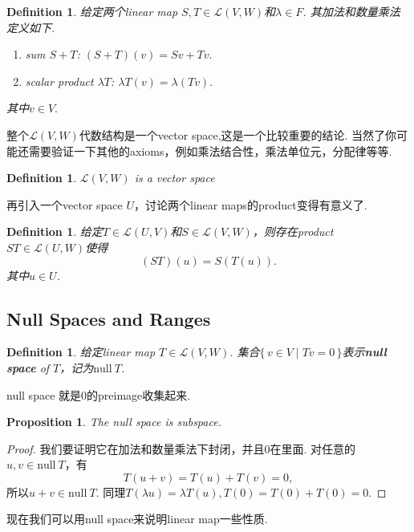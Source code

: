 \documentclass{article}
\newtheorem{proposition}[theorem]{Proposition}
\newtheorem{definition}[theorem]{Definition}
\newcommand\Set[2]{\{\,#1\mid#2\,\}} %
\newcommand\nul[1]{\text{null}\ #1}
\begin{document}
\begin{definition}
\rm 给定两个linear map $S,T \in \mathcal{L}(V,W)$和$\lambda \in F$. 其加法和数量乘法定义如下. 
\begin{enumerate}
	\item sum $S+T$: $(S+T)(v) = Sv+Tv.$
	\item scalar product $\lambda T$: $\lambda T(v) = \lambda(Tv).$
\end{enumerate}
其中$v \in V.$
\end{definition}

{\color{red} 整个$\mathcal{L}(V,W)$代数结构是一个vector space,这是一个比较重要的结论}. 当然了你可能还需要验证一下其他的axioms，例如乘法结合性，乘法单位元，分配律等等.

\begin{definition}
\rm $\mathcal{L}(V,W)$ is a vector space
\end{definition}

{\color{red} 再引入一个vector space $U$，讨论两个linear maps的product变得有意义了}.

\begin{definition}
\rm 给定$T \in \mathcal{L}(U,V)$和$S \in \mathcal{L}(V,W)$，则存在product $ST \in \mathcal{L}(U,W)$使得
$$
	(ST)(u) = S(T(u)).
$$
其中$u \in U$. 
\end{definition}

\newpage
\subsection{Null Spaces and Ranges}

\begin{definition}
\rm 给定linear map $T \in \mathcal{L}(V,W)$. 集合$\Set{v \in V}{Tv = 0}$表示\textbf{null space} of $T$，记为$\nul{T}$.
\end{definition}

{\color{red} null space 就是0的preimage收集起来}.

\begin{proposition}
\rm The null space is subspace.
\end{proposition}

\begin{proof}
我们要证明它在加法和数量乘法下封闭，并且$0$在里面. 对任意的$u,v \in \nul{T}$，有\[T(u+v) = T(u) + T(v) = 0,\]所以$u+v \in \nul{T}$. 同理$T(\lambda u) = \lambda T(u), T(0)=T(0)+T(0)=0$.
\end{proof}

{\color{red} 现在我们可以用null space来说明linear map一些性质}.
\end{document}
